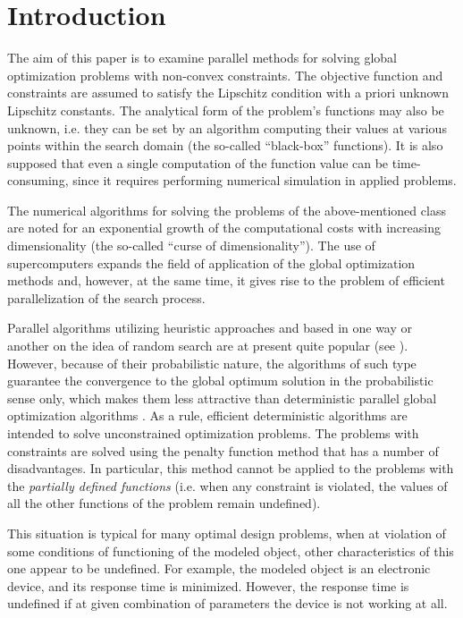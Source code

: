 \documentclass[smallextended]{svjour3}       %
\begin{document}
\section{Introduction}
\label{intro}

The aim of this paper is to examine parallel methods for solving global optimization problems 
with non-convex constraints. The objective function and constraints are assumed to satisfy the 
Lipschitz condition with a priori unknown Lipschitz constants. The analytical form of the 
problem's functions may also be unknown, i.e. they can be set by an algorithm computing their 
values at various points within the search domain (the so-called ``black-box'' functions). It is 
also supposed that even a single computation of the function value can be time-consuming, 
since it requires performing numerical simulation in applied problems. 

The numerical algorithms for solving the problems of the above-mentioned class are noted for 
an exponential growth of the computational costs with increasing dimensionality (the so-called 
``curse of dimensionality''). The use of supercomputers expands the field of application of the 
global optimization methods and, however, at the same time, it gives rise to the problem of 
efficient parallelization of the search process.

Parallel algorithms utilizing heuristic approaches and based in one way or another on the idea of 
random search are at present quite popular (see \cite{RefFerreiro,RefZhu,Korosec,Guerrero}). 
However, because of their probabilistic nature, the algorithms of such type guarantee the 
convergence to the global optimum solution in the probabilistic sense only, which makes them 
less attractive than deterministic parallel global optimization algorithms 
\cite{Jones2001,Paulavicius2011,Evtushenko2013,Strongin2000}. As a rule, efficient 
deterministic algorithms are intended to solve unconstrained optimization problems. The 
problems with constraints are solved using the penalty function method that has a number of 
disadvantages. In particular, this method cannot be applied to the problems with the 
\textit{partially defined functions} (i.e. when any constraint is violated, the values of all the 
other functions of the problem remain undefined).

This situation is typical for many optimal design problems, when at violation of some conditions 
of functioning of the modeled object, other characteristics of this one appear to be undefined. 
For example, the modeled object is an electronic device, and its response time is minimized. 
However, the response time is undefined if at given combination of parameters the device is not 
working at all.
\end{document}
